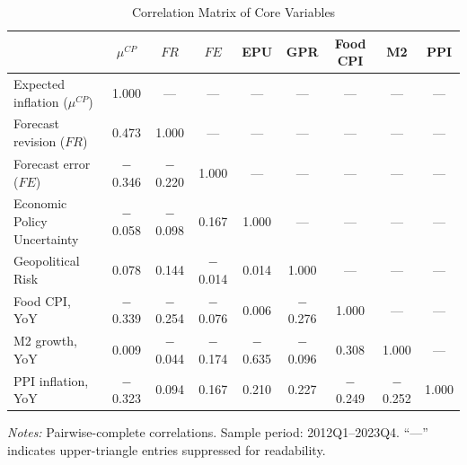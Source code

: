 \begin{table}[!htbp]
\centering
\small
\caption{Correlation Matrix of Core Variables}
\label{tab:correlation_matrix}
\begin{threeparttable}

\begin{tabular}{lcccccccc}
\toprule
 & $\mu^{CP}$ & $FR$ & $FE$ & EPU & GPR & Food CPI & M2 & PPI \\
\midrule
Expected inflation ($\mu^{CP}$) & 1.000 & --- & --- & --- & --- & --- & --- & --- \\
Forecast revision ($FR$) & 0.473 & 1.000 & --- & --- & --- & --- & --- & --- \\
Forecast error ($FE$) & $-$0.346 & $-$0.220 & 1.000 & --- & --- & --- & --- & --- \\
Economic Policy Uncertainty & $-$0.058 & $-$0.098 & 0.167 & 1.000 & --- & --- & --- & --- \\
Geopolitical Risk & 0.078 & 0.144 & $-$0.014 & 0.014 & 1.000 & --- & --- & --- \\
\addlinespace
Food CPI, YoY & $-$0.339 & $-$0.254 & $-$0.076 & 0.006 & $-$0.276 & 1.000 & --- & --- \\
M2 growth, YoY & 0.009 & $-$0.044 & $-$0.174 & $-$0.635 & $-$0.096 & 0.308 & 1.000 & --- \\
PPI inflation, YoY & $-$0.323 & 0.094 & 0.167 & 0.210 & 0.227 & $-$0.249 & $-$0.252 & 1.000 \\
\bottomrule
\end{tabular}
\begin{tablenotes}[flushleft]
\footnotesize
\item \textit{Notes:} Pairwise-complete correlations. Sample period: 2012Q1--2023Q4. ``---'' indicates upper-triangle entries suppressed for readability.
\end{tablenotes}
\end{threeparttable}
\end{table}
